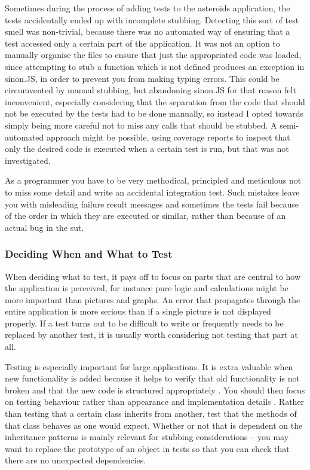 \documentclass[11pt]{article}
\begin{document}
Sometimes during the process of adding tests to the asteroids application, the tests accidentally ended up with incomplete stubbing. Detecting this sort of test smell was non-trivial, because there was no automated way of ensuring that a test accessed only a certain part of the application. It was not an option to manually organise the files to ensure that just the appropriated code was loaded, since attempting to stub a function which is not defined produces an exception in sinon.JS, in order to prevent you from making typing errors. This could be circumvented by manual stubbing, but abandoning sinon.JS for that reason felt inconvenient, especially considering that the separation from the code that should not be executed by the tests had to be done manually, so instead I opted towards simply being more careful not to miss any calls that should be stubbed. A semi-automated approach might be possible, using coverage reports to inspect that only the desired code is executed when a certain test is run, but that was not investigated.

As a programmer you have to be very methodical, principled and meticulous not to miss some detail and write an accidental integration test. Such mistakes leave you with misleading failure result messages and sometimes the tests fail because of the order in which they are executed or similar, rather than because of an actual bug in the \gls{sut}.

\subsubsection{Deciding When and What to Test}

When deciding what to test, it pays off to focus on parts that are central to how the application is perceived, for instance pure logic and calculations might be more important than pictures and graphs. An error that propagates through the entire application is more serious than if a single picture is not displayed properly. If a test turns out to be difficult to write or frequently needs to be replaced by another test, it is usually worth considering not testing that part at all. \cite[questions~9-10]{Edelstam}

Testing is especially important for large applications. It is extra valuable when new functionality is added because it helps to verify that old functionality is not broken and that the new code is structured appropriately \cite[questions~6-7]{Stenmark}. You should then focus on testing behaviour rather than appearance and implementation details \cite[question~10]{Edelstam}. Rather than testing that a certain class inherits from another, test that the methods of that class behaves as one would expect. Whether or not that is dependent on the inheritance patterns is mainly relevant for stubbing considerations -- you may want to replace the prototype of an object in tests so that you can check that there are no unexpected dependencies.
\end{document}

